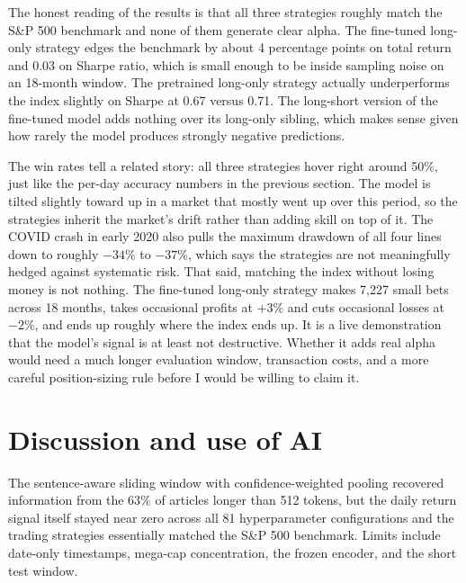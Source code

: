 \documentclass[11pt]{article}
\begin{document}
The honest reading of the results is that all three strategies roughly match the S\&P 500 benchmark and none of them generate clear alpha. The fine-tuned long-only strategy edges the benchmark by about 4 percentage points on total return and 0.03 on Sharpe ratio, which is small enough to be inside sampling noise on an 18-month window. The pretrained long-only strategy actually underperforms the index slightly on Sharpe at 0.67 versus 0.71. The long-short version of the fine-tuned model adds nothing over its long-only sibling, which makes sense given how rarely the model produces strongly negative predictions.

The win rates tell a related story: all three strategies hover right around 50\%, just like the per-day accuracy numbers in the previous section. The model is tilted slightly toward up in a market that mostly went up over this period, so the strategies inherit the market's drift rather than adding skill on top of it. The COVID crash in early 2020 also pulls the maximum drawdown of all four lines down to roughly $-34\%$ to $-37\%$, which says the strategies are not meaningfully hedged against systematic risk. That said, matching the index without losing money is not nothing. The fine-tuned long-only strategy makes 7{,}227 small bets across 18 months, takes occasional profits at $+3\%$ and cuts occasional losses at $-2\%$, and ends up roughly where the index ends up. It is a live demonstration that the model's signal is at least not destructive. Whether it adds real alpha would need a much longer evaluation window, transaction costs, and a more careful position-sizing rule before I would be willing to claim it.

\section{Discussion and use of AI}

The sentence-aware sliding window with confidence-weighted pooling recovered information from the 63\% of articles longer than 512 tokens, but the daily return signal itself stayed near zero across all 81 hyperparameter configurations and the trading strategies essentially matched the S\&P 500 benchmark. Limits include date-only timestamps, mega-cap concentration, the frozen encoder, and the short test window.
\end{document}

